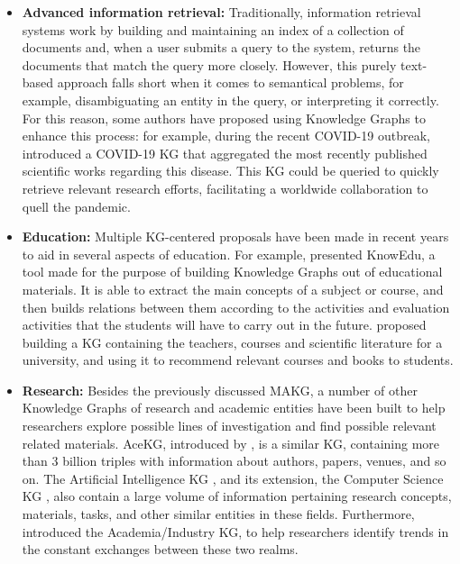 \begin{itemize}
    \item \textbf{Advanced information retrieval:} Traditionally, information retrieval systems work by building and maintaining an index of a collection of documents and, when a user submits a query to the system, returns the documents that match the query more closely. However, this purely text-based approach falls short when it comes to semantical problems, for example, disambiguating an entity in the query, or interpreting it correctly. For this reason, some authors have proposed using Knowledge Graphs to enhance this process: for example, during the recent COVID-19 outbreak, \citet{wise2020} introduced a COVID-19 KG that aggregated the most recently published scientific works regarding this disease. This KG could be queried to quickly retrieve relevant research efforts, facilitating a worldwide collaboration to quell the pandemic.\\
    
    \item \textbf{Education:} Multiple KG-centered proposals have been made in recent years to aid in several aspects of education. For example, \citet{chen2018} presented KnowEdu, a tool made for the purpose of building Knowledge Graphs out of educational materials. It is able to extract the main concepts of a subject or course, and then builds relations between them according to the activities and evaluation activities that the students will have to carry out in the future. \citet{aliyu2020} proposed building a KG containing the teachers, courses and scientific literature for a university, and using it to recommend relevant courses and books to students.\\
    
    \item \textbf{Research:} Besides the previously discussed MAKG, a number of other Knowledge Graphs of research and academic entities have been built to help researchers explore possible lines of investigation and find possible relevant related materials. AceKG, introduced by \citet{wang2018}, is a similar KG, containing more than 3 billion triples with information about authors, papers, venues, and so on. The Artificial Intelligence KG \cite{dessi2020aikg}, and its extension, the Computer Science KG \cite{dessi2022cskg}, also contain a large volume of information pertaining research concepts, materials, tasks, and other similar entities in these fields. Furthermore, \citet{angioni2021} introduced the Academia/Industry KG, to help researchers identify trends in the constant exchanges between these two realms.\\
    

\end{itemize}
